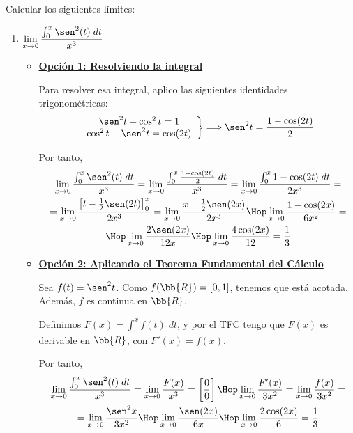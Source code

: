 \begin{ejercicio}
    Calcular los siguientes límites:
    \begin{enumerate}
        \item $\displaystyle \lim_{x\to 0}\frac{\int_0^x \sen^2(t)\;dt}{x^3}$

        \begin{itemize}
            \item \textbf{\underline{Opción 1: Resolviendo la integral}}
            
            Para resolver esa integral, aplico las siguientes identidades trigonométricas:
            \begin{equation*}
                \left.\begin{array}{c}
                    \sen^2 t + \cos^2 t =1 \\
                    \cos^2 t - \sen^2 t = \cos(2t) 
                \end{array}\right\} \Longrightarrow
                \sen^2 t = \frac{1-\cos(2t)}{2}
            \end{equation*}
        
            Por tanto,
            \begin{multline*}
                \lim_{x\to 0}\frac{\int_0^x \sen^2(t)\;dt}{x^3}
                = \lim_{x\to 0}\frac{\int_0^x \frac{1-\cos(2t)}{2}\;dt}{x^3}
                = \lim_{x\to 0}\frac{\int_0^x 1-\cos(2t)\;dt}{2x^3}
                =\\= \lim_{x\to 0}\frac{\left[t-\frac{1}{2}\sen(2t)\right]_0^x}{2x^3}
                = \lim_{x\to 0}\frac{x-\frac{1}{2}\sen(2x)}{2x^3}
                \Hop
                \lim_{x\to 0}\frac{1-\cos(2x)}{6x^2}
                =\\\Hop
                \lim_{x\to 0}\frac{2\sen(2x)}{12x}
                \Hop
                \lim_{x\to 0}\frac{4\cos(2x)}{12} = \frac{1}{3}
            \end{multline*}


            \item \textbf{\underline{Opción 2: Aplicando el Teorema Fundamental del Cálculo}}

            Sea $f(t)=\sen^2 t$. Como $f(\bb{R})=[0,1]$, tenemos que está acotada. Además, $f$ es continua en $\bb{R}$.

            Definimos $F(x)=\int_0^x f(t)\;dt$, y por el TFC tengo que $F(x)$ es derivable en $\bb{R}$, con $F'(x)=f(x)$.

            Por tanto,
            \begin{multline*}
                \lim_{x\to 0}\frac{\int_0^x \sen^2(t)\;dt}{x^3}
                = \lim_{x\to 0}\frac{F(x)}{x^3}
                = \left[\frac{0}{0}\right]
                \Hop
                \lim_{x\to 0}\frac{F'(x)}{3x^2}
                = \lim_{x\to 0}\frac{f(x)}{3x^2}
                =\\= \lim_{x\to 0}\frac{\sen^2 x}{3x^2}
                \Hop
                \lim_{x\to 0}\frac{\sen (2x)}{6x}
                \Hop
                \lim_{x\to 0}\frac{2\cos (2x)}{6} = \frac{1}{3}
            \end{multline*}
            

\end{itemize}
\end{enumerate}
\end{ejercicio}
